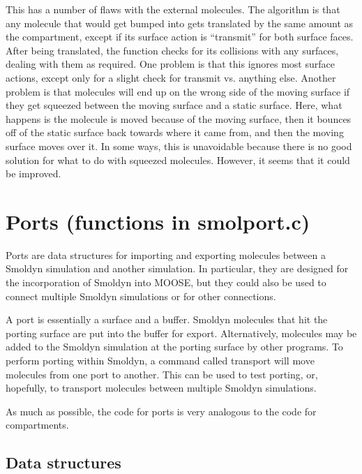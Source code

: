 \documentclass {scrbook}
\begin{document}
\begin{description}
This has a number of flaws with the external molecules. The algorithm is that any molecule that would get bumped into gets translated by the same amount as the compartment, except if its surface action is ``transmit'' for both surface faces. After being translated, the function checks for its collisions with any surfaces, dealing with them as required. One problem is that this ignores most surface actions, except only for a slight check for transmit vs. anything else. Another problem is that molecules will end up on the wrong side of the moving surface if they get squeezed between the moving surface and a static surface. Here, what happens is the molecule is moved because of the moving surface, then it bounces off of the static surface back towards where it came from, and then the moving surface moves over it. In some ways, this is unavoidable because there is no good solution for what to do with squeezed molecules. However, it seems that it could be improved.

\end{description}

\section{Ports (functions in smolport.c)}

Ports are data structures for importing and exporting molecules between a Smoldyn simulation and another simulation. In particular, they are designed for the incorporation of Smoldyn into MOOSE, but they could also be used to connect multiple Smoldyn simulations or for other connections.

A port is essentially a surface and a buffer. Smoldyn molecules that hit the porting surface are put into the buffer for export. Alternatively, molecules may be added to the Smoldyn simulation at the porting surface by other programs. To perform porting within Smoldyn, a command called transport will move molecules from one port to another. This can be used to test porting, or, hopefully, to transport molecules between multiple Smoldyn simulations.

As much as possible, the code for ports is very analogous to the code for compartments.

\subsection{Data structures}
\end{document}
